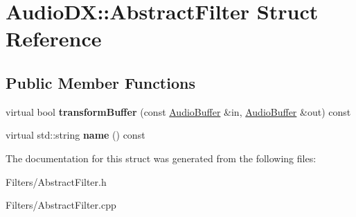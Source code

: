 \hypertarget{struct_audio_d_x_1_1_abstract_filter}{\section{Audio\-D\-X\-:\-:Abstract\-Filter Struct Reference}
\label{struct_audio_d_x_1_1_abstract_filter}
}
\subsection*{Public Member Functions}
\begin{DoxyCompactItemize}
\item 
\hypertarget{struct_audio_d_x_1_1_abstract_filter_acb0766f87312bd44f60c3b8953e45a92}{virtual bool {\bfseries transform\-Buffer} (const \hyperlink{class_audio_d_x_1_1_audio_buffer}{Audio\-Buffer} \&in, \hyperlink{class_audio_d_x_1_1_audio_buffer}{Audio\-Buffer} \&out) const }\label{struct_audio_d_x_1_1_abstract_filter_acb0766f87312bd44f60c3b8953e45a92}

\item 
\hypertarget{struct_audio_d_x_1_1_abstract_filter_a5694dc549dac4531c67e3f56b9e7e52d}{virtual std\-::string {\bfseries name} () const }\label{struct_audio_d_x_1_1_abstract_filter_a5694dc549dac4531c67e3f56b9e7e52d}

\end{DoxyCompactItemize}


The documentation for this struct was generated from the following files\-:\begin{DoxyCompactItemize}
\item 
Filters/Abstract\-Filter.\-h\item 
Filters/Abstract\-Filter.\-cpp\end{DoxyCompactItemize}
